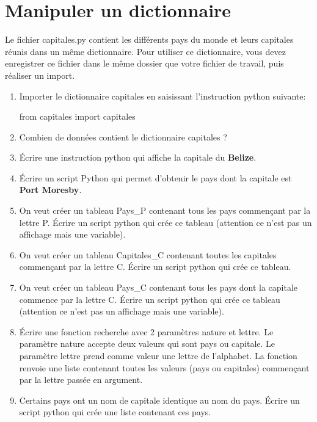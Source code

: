\documentclass[12pt,a4paper]{article}
\begin{document}
\newpage
\section*{Manipuler un dictionnaire}

Le fichier \textsf{capitales.py} contient les différents pays du monde et leurs capitales réunis dans un même dictionnaire. Pour utiliser ce dictionnaire, vous devez enregistrer ce fichier dans le même dossier que votre fichier de travail, puis réaliser un \textsf{import}.

\begin{enumerate}
\item Importer le dictionnaire \textsf{capitales} en saisissant l'instruction python suivante:

\textsf{from capitales import capitales}

\item Combien de données contient le dictionnaire \textsf{capitales} ?

\item Écrire une instruction python qui affiche la capitale du \textbf{Belize}.

\item Écrire un script Python qui permet d'obtenir le pays dont la capitale est \textbf{Port Moresby}.

\item On veut créer un tableau \textsf{Pays\_P} contenant tous les pays commençant par la lettre \textsf{P}. Écrire un script python qui crée ce tableau (attention ce n'est pas un affichage mais une variable).

\item On veut créer un tableau \textsf{Capitales\_C} contenant toutes les capitales commençant par la lettre \textsf{C}. Écrire un script python qui crée ce tableau.

\item On veut créer un tableau \textsf{Pays\_C} contenant tous les pays dont la capitale commence par la lettre \textsf{C}. Écrire un script python qui crée ce tableau (attention ce n'est pas un affichage mais une variable).

\item Écrire une fonction \textsf{recherche} avec 2 paramètres \textsf{nature} et \textsf{lettre}. Le paramètre \textsf{nature} accepte deux valeurs qui sont \textsf{pays} ou \textsf{capitale}. Le paramètre \textsf{lettre} prend comme valeur une \textsf{lettre} de l'alphabet. La fonction renvoie une liste contenant toutes les valeurs (pays ou capitales) commençant par la lettre passée en argument.


\item Certains pays ont un nom de capitale identique au nom du pays. Écrire un script python qui crée une liste contenant ces pays.
\end{enumerate}
\end{document}
